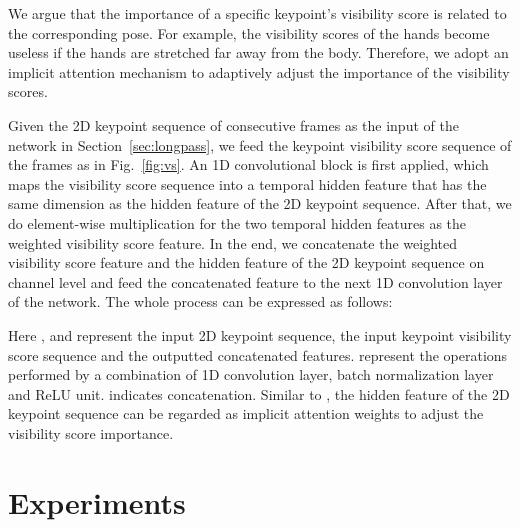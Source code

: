 \documentclass[journal]{IEEEtran}
\begin{document}
We argue that the importance of a specific keypoint's visibility score is related to the corresponding pose. For example, the visibility scores of the hands become useless if the hands are stretched far away from the body. Therefore, we adopt an implicit attention mechanism to adaptively adjust the importance of the visibility scores.



Given the 2D keypoint sequence of  consecutive frames as the input of the network in Section~\ref{sec:longpass}, we feed the keypoint visibility score sequence of the  frames as in Fig.~\ref{fig:vs}. An 1D convolutional block is first applied, which maps the visibility score sequence into a temporal hidden feature that has the same dimension as the hidden feature of the 2D keypoint sequence. After that, we do element-wise multiplication for the two temporal hidden features as the weighted visibility score feature. In the end, we concatenate the weighted visibility score feature and the hidden feature of the 2D keypoint sequence on channel level and feed the concatenated feature to the next 1D convolution layer of the network. The whole process can be expressed as follows:



Here ,  and  represent the input 2D keypoint sequence, the input keypoint visibility score sequence and the outputted concatenated features.  represent the operations performed by a combination of 1D convolution layer, batch normalization layer and ReLU unit. indicates concatenation. Similar to \cite{kim2016multimodal}, the hidden feature of the 2D keypoint sequence can be regarded as implicit attention weights to adjust the visibility score importance. 



%
 \section{Experiments} \label{sec:exp}
\end{document}
